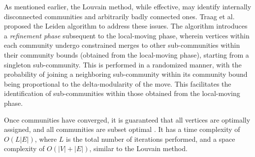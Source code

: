As mentioned earlier, the Louvain method, while effective, may identify internally disconnected communities and arbitrarily badly connected ones. Traag et al. \cite{com-traag19} proposed the Leiden algorithm to address these issues. The algorithm introduces a \textit{refinement phase} subsequent to the local-moving phase, wherein vertices within each community undergo constrained merges to other sub-communities within their community bounds (obtained from the local-moving phase), starting from a singleton sub-community. This is performed in a randomized manner, with the probability of joining a neighboring sub-community within its community bound being proportional to the delta-modularity of the move. This facilitates the identification of sub-communities within those obtained from the local-moving phase. Once communities have converged, it is guaranteed that all vertices are optimally assigned, and all communities are subset optimal \cite{com-traag19}. It has a time complexity of $O (L |E|)$, where $L$ is the total number of iterations performed, and a space complexity of $O(|V| + |E|)$, similar to the Louvain method.
